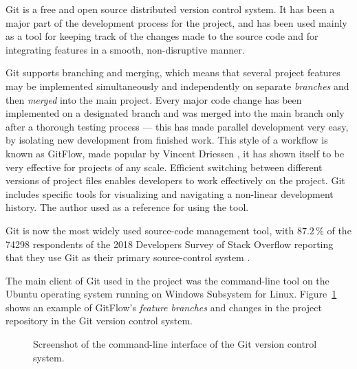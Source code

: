 \documentclass[english,bachelors,forcepolishlogotype]{wizthesis}
\begin{document}
Git \cite{git} is a free and open source distributed version control system. It
has been a major part of the development process for the project, and has been
used mainly as a tool for keeping track of the changes made to the source code
and for integrating features in a smooth, non-disruptive manner.

Git supports branching and merging, which means that several project features
may be implemented simultaneously and independently on separate \emph{branches}
and then \emph{merged} into the main project. Every major code change has been
implemented on a designated branch and was merged into the main branch only
after a thorough testing process --- this has made parallel development very
easy, by isolating new development from finished work. This style of a workflow
is known as GitFlow, made popular by Vincent Driessen \cite{git-flow}, it has
shown itself to be very effective for projects of any scale. Efficient switching
between different versions of project files enables developers to work
effectively on the project. Git includes specific tools for visualizing and
navigating a non-linear development history. The author used \cite{chacon-2014}
as a reference for using the tool.

Git is now the most widely used source-code management tool, with $87.2\,\%$ of
the 74298 respondents of the 2018 Developers Survey of Stack Overflow reporting
that they use Git as their primary source-control system
\cite{stack-overflow-insights-2018}.

The main client of Git used in the project was the command-line tool on the
Ubuntu operating system running on Windows Subsystem for Linux.
Figure~\ref{fig:git} shows an example of GitFlow's \emph{feature branches} and
changes in the project repository in the Git version control system.

\begin{figure}[h]
  \centering
  \caption{Screenshot of the command-line interface of the Git version control
  system.}
  \label{fig:git}
\end{figure}
\end{document}
